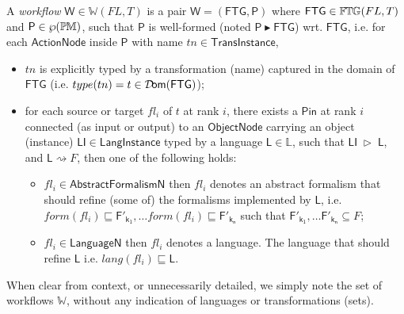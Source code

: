 \begin{Definition}
   A \emph{workflow} $\mathsf{W}\in\mathbb{W}(FL, T)$ is a pair $\mathsf{W} = 
(\mathsf{FTG}, \mathsf{P})$ where $\mathsf{FTG}\in\mathbb{F}\mskip-1mu\mathbb{T}\mskip-1mu\mathbb{G}(FL, T)$ and 
$\mathsf{P}\in\wp(\mathbb{P}\mskip-1mu\mathbb{M})$, such that $\mathsf{P}$ is well-formed (noted 
$\mathsf{P} \blacktriangleright \mathsf{FTG}$) wrt. $\mathsf{FTG}$, i.e. for 
each $\mathsf{ActionNode}$ inside $\mathsf{P}$ with name 
$tn\in\mathsf{TransInstance}$,
\begin{itemize}
   \item $tn$ is explicitly typed by a transformation (name) captured in the 
domain of $\mathsf{FTG}$ (i.e. $type(tn) = t \in \mathsf{\mathcal{D}\!om}(\mathsf{FTG})$);

   \item for each source or target $fl_i$ of $t$ at rank $i$, there exists a 
$\mathsf{Pin}$ at rank $i$ connected (as input or output) to an 
$\mathsf{ObjectNode}$ carrying an object (instance) $\mathsf{LI}\in 
\mathsf{LangInstance}$ typed by a language $\mathsf{L}\in\mathbb{L}$, such that 
$\mathsf{LI} \;\rhd\; \mathsf{L}$, and $\mathsf{L}\rightsquigarrow F$, then one 
of the following holds:
   \begin{itemize}
      \item $fl_i\in \mathsf{AbstractFormalismN}$ then $fl_i$ denotes an 
abstract formalism that should refine (some 
of) the formalisms implemented by $\mathsf{L}$, i.e. $form(fl_i) \sqsubseteq 
\mathsf{F'_{k_1}}, \ldots form(fl_i) \sqsubseteq \mathsf{F'_{k_n}}$ such that 
$\mathsf{F'_{k_1}}, \ldots \mathsf{F'_{k_n}} \subseteq F$;
      
      \item $fl_i\in \mathsf{LanguageN}$ then $fl_i$ denotes a language. The 
language that should refine $\mathsf{L}$ i.e. $lang(fl_i) \sqsubseteq 
\mathsf{L}$.
   \end{itemize}
\end{itemize}
\end{Definition}
\noindent
When clear from context, or unnecessarily detailed, we simply note the set of 
workflows $\mathbb{W}$, without any indication of languages or 
transformations (sets).


